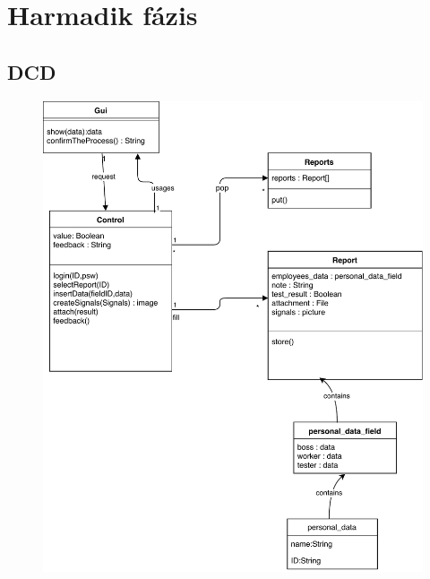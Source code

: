 \chapter{Harmadik fázis}\label{sect:ThirdPhase}

\section{DCD}

\begin{figure}[!h]
	\centering
	\includegraphics[trim = 0mm 0mm 0mm 0mm,clip,width=130mm, keepaspectratio]{figures/dcd2.pdf}
\end{figure}